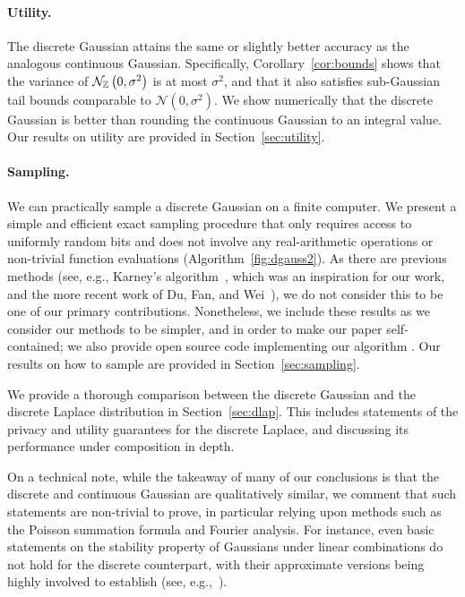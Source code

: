 \documentclass{jpc}
\newcommand{\dgausss}[2]{{\discN\left(#1,#2\right)}}
\newcommand{\dgauss}[1]{\dgausss{0}{#1}}
\begin{document}
\paragraph{Utility.} The discrete Gaussian attains the same or slightly better accuracy as the analogous continuous Gaussian. Specifically, Corollary~\ref{cor:bounds} shows that the variance of $\dgauss{\sigma^2}$ is at most $\sigma^2$, and that it also satisfies sub-Gaussian tail bounds comparable to $\mathcal{N}(0,\sigma^2)$. We show numerically that the discrete Gaussian is better than rounding the continuous Gaussian to an integral value. Our results on utility are provided in Section~\ref{sec:utility}.

\paragraph{Sampling.} We can practically sample a discrete Gaussian on a finite computer. We present a simple and efficient exact sampling procedure that only requires access to uniformly random bits and does not involve any real-arithmetic operations or non-trivial function evaluations (Algorithm~\ref{fig:dgauss2}). As there are previous methods (see, e.g., Karney's algorithm~\citep{Karney16}, which was an inspiration for our work, and the more recent work of Du, Fan, and Wei~\citep{DuFW20}), we do not consider this to be one of our primary contributions. Nonetheless, we include these results as we consider our methods to be simpler, and in order to make our paper self-contained; we also provide open source code implementing our algorithm \citep{DGaussGithub}. Our results on how to sample are provided in Section~\ref{sec:sampling}.

We provide a thorough comparison between the discrete Gaussian and the discrete Laplace distribution in Section~\ref{sec:dlap}. This includes statements of the privacy and utility guarantees for the discrete Laplace, and discussing its performance under composition in depth. 

On a technical note, while the takeaway of many of our conclusions is that the discrete and continuous Gaussian are qualitatively similar, we comment that such statements are non-trivial to prove, in particular relying upon methods such as the Poisson summation formula and Fourier analysis. For instance, even basic statements on the stability property of Gaussians under linear combinations do not hold for the discrete counterpart, with their approximate versions being highly involved to establish (see, e.g.,~\citep{AggarwalR16}).
\end{document}
